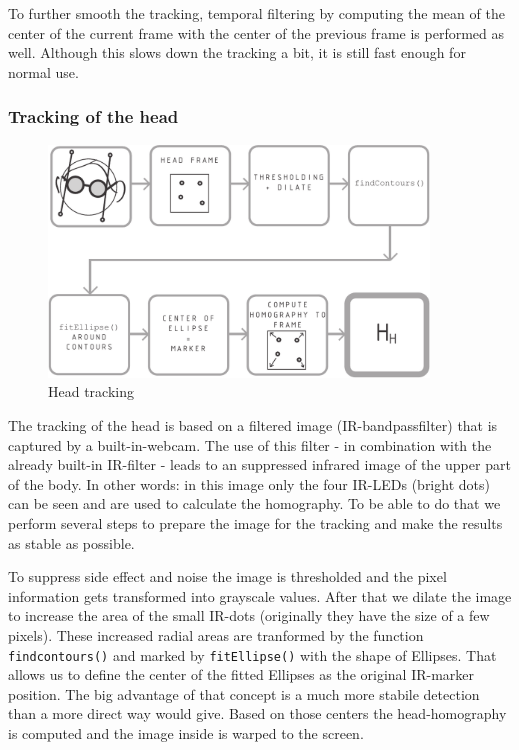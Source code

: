 To further smooth the tracking, temporal filtering by computing the mean of the center of the current frame with the center of the previous frame is performed as well. 
Although this slows down the tracking a bit, it is still fast enough for normal use.

\subsubsection{Tracking of the head}
\begin{figure}[H]
  \centering
  \includegraphics[width=0.9\textwidth]{../finalpres/03c.pdf}
  \caption{Head tracking}\label{fig:head}
\end{figure}

The tracking of the head is based on a filtered image (IR-bandpassfilter) that is captured by a built-in-webcam. The use of this filter - in combination with the already built-in IR-filter - leads to an suppressed infrared image of the upper part of the body. 
In other words: in this image only the four IR-LEDs (bright dots) can be seen and are used to calculate the homography. 
To be able to do that we perform several steps to prepare the image for the tracking and make the results as stable as possible.

To suppress side effect and noise the image is thresholded and the pixel information gets transformed into grayscale values. 
After that we dilate the image to increase the area of the small IR-dots (originally they have the size of a few pixels). 
These increased radial areas are tranformed by the function \texttt{findcontours()} and marked by \texttt{fitEllipse()} with the shape of Ellipses. 
That allows us to define the center of the fitted Ellipses as the original IR-marker position. 
The big advantage of that concept is a much more stabile detection than a more direct way would give.
Based on those centers the head-homography is computed and the image inside is warped to the screen.
 

